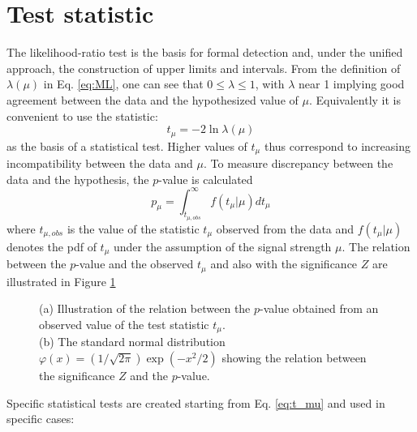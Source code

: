 \documentclass[a4paper, oneside, 11pt, openright]{book}
\begin{document}
 		\section{Test statistic}
 			The likelihood-ratio test \cite{Statistic} is the basis for formal detection and, under the unified approach, the construction of upper limits and intervals. %
 			From the definition of $\lambda(\mu)$ in Eq. \ref{eq:ML}, one can see that $0 \leq \lambda \leq 1$, with $\lambda$ near 1 implying good agreement between the data and the hypothesized value of $\mu$. Equivalently it is convenient to use the statistic:
 			\begin{equation}\label{eq:t_mu}
 				t_{\mu} = -2\ln\lambda(\mu)
 			\end{equation}
 			as the basis of a statistical test. Higher values of $t_{\mu}$ thus correspond to increasing incompatibility between the data and $\mu$. To measure discrepancy between the data and the hypothesis, the $p$-value is calculated
 			\begin{equation}\label{eq:p_mu}
 				p_{\mu} = \int_{t_{\mu,obs}}^{\infty} f(t_{\mu}|\mu) dt_{\mu}
 			\end{equation}
 			where $t_{\mu,obs}$ is the value of the statistic $t_{\mu}$ observed from the data and $f(t_{\mu}|\mu)$ denotes the pdf of $t_{\mu}$ under the assumption of the signal strength $\mu$. The relation between the $p$-value and the observed $t_{\mu}$ and also with the significance $Z$ are illustrated in Figure \ref{fig:p_mu_Z}
 			\begin{figure}
 				\centering
 				\caption{(a) Illustration of the relation between the $p$-value obtained from an observed value of the test statistic $t_{\mu}$.\\ (b) The standard normal distribution $\varphi(x)=(1/\sqrt{2\pi})\exp(-x^2/2)$ showing the relation between the significance $Z$ and the $p$-value.}
 				\label{fig:p_mu_Z}
 			\end{figure}
 			\vspace{-3cm}
 			Specific statistical tests are created starting from Eq. \ref{eq:t_mu} and used in specific cases:
\end{document}
